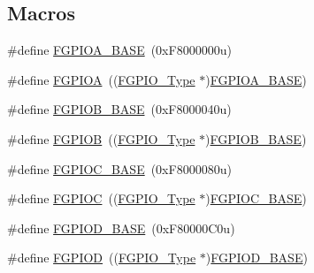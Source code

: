\subsection*{Macros}
\begin{DoxyCompactItemize}
\item 
\#define \mbox{\hyperlink{group___f_g_p_i_o___peripheral___access___layer_ga5be504106abad77cbd9d7d05bce089bb}{F\+G\+P\+I\+O\+A\+\_\+\+B\+A\+SE}}~(0x\+F8000000u)
\item 
\#define \mbox{\hyperlink{group___f_g_p_i_o___peripheral___access___layer_gae9c9828758a8c2a392181efa5f88ff23}{F\+G\+P\+I\+OA}}~((\mbox{\hyperlink{struct_f_g_p_i_o___type}{F\+G\+P\+I\+O\+\_\+\+Type}} $\ast$)\mbox{\hyperlink{group___f_g_p_i_o___peripheral___access___layer_ga5be504106abad77cbd9d7d05bce089bb}{F\+G\+P\+I\+O\+A\+\_\+\+B\+A\+SE}})
\item 
\#define \mbox{\hyperlink{group___f_g_p_i_o___peripheral___access___layer_gae82f132d064f5a999cb0191619628cd4}{F\+G\+P\+I\+O\+B\+\_\+\+B\+A\+SE}}~(0x\+F8000040u)
\item 
\#define \mbox{\hyperlink{group___f_g_p_i_o___peripheral___access___layer_gab6c2eaacd50ab03a400e2cf6fcff5e62}{F\+G\+P\+I\+OB}}~((\mbox{\hyperlink{struct_f_g_p_i_o___type}{F\+G\+P\+I\+O\+\_\+\+Type}} $\ast$)\mbox{\hyperlink{group___f_g_p_i_o___peripheral___access___layer_gae82f132d064f5a999cb0191619628cd4}{F\+G\+P\+I\+O\+B\+\_\+\+B\+A\+SE}})
\item 
\#define \mbox{\hyperlink{group___f_g_p_i_o___peripheral___access___layer_ga5a8489a84c23b5ff6aae4e0d3048c861}{F\+G\+P\+I\+O\+C\+\_\+\+B\+A\+SE}}~(0x\+F8000080u)
\item 
\#define \mbox{\hyperlink{group___f_g_p_i_o___peripheral___access___layer_ga587b64f3ba8e092c9b25a04c4129c6ae}{F\+G\+P\+I\+OC}}~((\mbox{\hyperlink{struct_f_g_p_i_o___type}{F\+G\+P\+I\+O\+\_\+\+Type}} $\ast$)\mbox{\hyperlink{group___f_g_p_i_o___peripheral___access___layer_ga5a8489a84c23b5ff6aae4e0d3048c861}{F\+G\+P\+I\+O\+C\+\_\+\+B\+A\+SE}})
\item 
\#define \mbox{\hyperlink{group___f_g_p_i_o___peripheral___access___layer_ga5b3caca7e9c439b235d8390e79731b88}{F\+G\+P\+I\+O\+D\+\_\+\+B\+A\+SE}}~(0x\+F80000\+C0u)
\item 
\#define \mbox{\hyperlink{group___f_g_p_i_o___peripheral___access___layer_ga1a5d3d931f255610ab606286b6f50690}{F\+G\+P\+I\+OD}}~((\mbox{\hyperlink{struct_f_g_p_i_o___type}{F\+G\+P\+I\+O\+\_\+\+Type}} $\ast$)\mbox{\hyperlink{group___f_g_p_i_o___peripheral___access___layer_ga5b3caca7e9c439b235d8390e79731b88}{F\+G\+P\+I\+O\+D\+\_\+\+B\+A\+SE}})

\end{DoxyCompactItemize}
